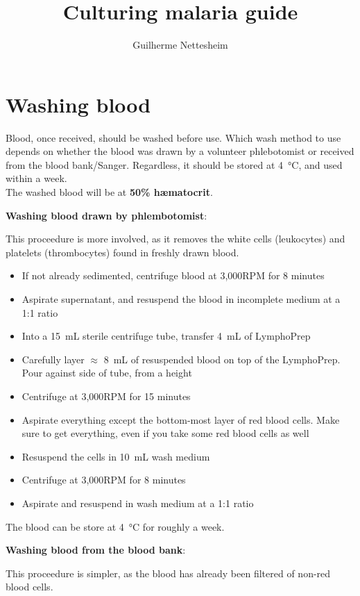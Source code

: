 \documentclass{article}
\author{Guilherme Nettesheim}
\title{Culturing malaria guide}
\begin{document}
\maketitle

\section{Washing blood}

Blood, once received, should be washed before use. Which wash method to use depends on whether the blood was drawn by a volunteer phlebotomist or received from the blood bank/Sanger. Regardless, it should be stored at \SI{4}{\celsius}, and used within a week.\\

The washed blood will be at \textbf{50\% h{\ae}matocrit}.

\textbf{Washing blood drawn by phlembotomist}:

This proceedure is more involved, as it removes the white cells (leukocytes) and platelets (thrombocytes) found in freshly drawn blood.

\begin{itemize}
	\item If not already sedimented, centrifuge blood at 3,000RPM for 8 minutes
	\item Aspirate supernatant, and resuspend the blood in incomplete medium at a 1:1 ratio
	\item Into a \SI{15}{mL} sterile centrifuge tube, transfer \SI{4}{mL} of LymphoPrep
	\item Carefully layer $\approx$ \SI{8}{mL} of resuspended blood on top of the LymphoPrep. Pour against side of tube, from a height
	\item Centrifuge at 3,000RPM for 15 minutes
	\item Aspirate everything except the bottom-most layer of red blood cells. Make sure to get everything, even if you take some red blood cells as well
	\item Resuspend the cells in \SI{10}{mL} wash medium
	\item Centrifuge at 3,000RPM for 8 minutes
	\item Aspirate and resuspend in wash medium at a 1:1 ratio
\end{itemize}

The blood can be store at \SI{4}{\celsius} for roughly a week.

\textbf{Washing blood from the blood bank}:

This proceedure is simpler, as the blood has already been filtered of non-red blood cells.
\end{document}
